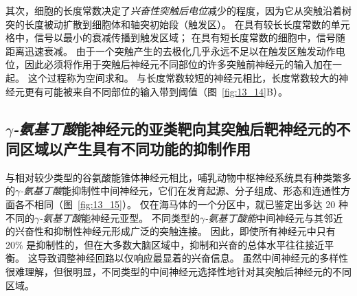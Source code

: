 其次，细胞的长度常数决定了\textit{兴奋性突触后电位}减少的程度，因为它从突触沿着树突的长度被动扩散到细胞体和轴突初始段（触发区）。
在具有较长长度常数的单元格中，信号以最小的衰减传播到触发区域；
在具有短长度常数的细胞中，信号随距离迅速衰减。
由于一个突触产生的去极化几乎永远不足以在触发区触发动作电位，因此必须将作用于突触后神经元不同部位的许多突触前神经元的输入加在一起。
这个过程称为空间求和。
与长度常数较短的神经元相比，长度常数较大的神经元更有可能被来自不同部位的输入带到阈值（图~\ref{fig:13_14}B）。



\subsection{\textit{$\gamma$-氨基丁酸}能神经元的亚类靶向其突触后靶神经元的不同区域以产生具有不同功能的抑制作用}

与相对较少类型的谷氨酸能锥体神经元相比，哺乳动物中枢神经系统具有种类繁多的\textit{$\gamma$-氨基丁酸}能抑制性中间神经元，它们在发育起源、分子组成、形态和连通性方面各不相同（图~\ref{fig:13_15}）。
仅在海马体的一个分区中，就已鉴定出多达 20 种不同的\textit{$\gamma$-氨基丁酸}能神经元亚型。
不同类型的\textit{$\gamma$-氨基丁酸能}中间神经元与其邻近的兴奋性和抑制性神经元形成广泛的突触连接。
因此，即使所有神经元中只有 20\% 是抑制性的，但在大多数大脑区域中，抑制和兴奋的总体水平往往接近平衡。
这导致调整神经回路以仅响应最显着的兴奋信息。
虽然中间神经元的多样性很难理解，但很明显，不同类型的中间神经元选择性地针对其突触后神经元的不同区域。


